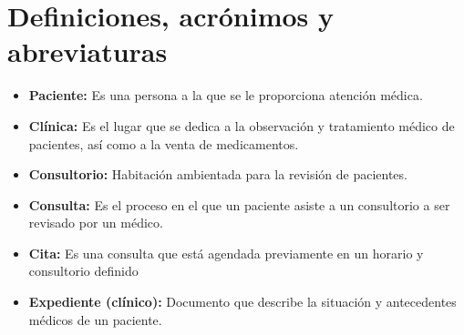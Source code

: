 \section{Definiciones, acrónimos y abreviaturas}

\begin{itemize}
\item \textbf{Paciente: }Es una persona a la que se le proporciona atención médica.
\item \textbf{Clínica: }Es el lugar que se dedica a la observación y tratamiento médico de pacientes, así como a la venta de medicamentos.
\item \textbf{Consultorio: }Habitación ambientada para la revisión de pacientes.
\item \textbf{Consulta: }Es el proceso en el que un paciente asiste a un consultorio a ser revisado por un médico.
\item \textbf{Cita: }Es una consulta que está agendada previamente en un horario y consultorio definido
\item \textbf{Expediente (clínico): }Documento que describe la situación y antecedentes médicos de un paciente.
\end{itemize}

